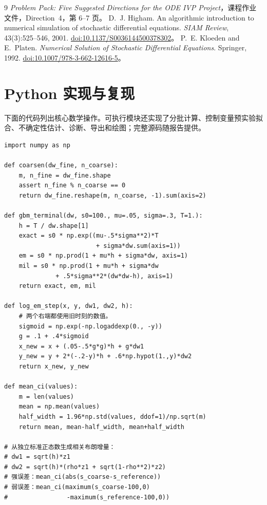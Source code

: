 \documentclass[11pt,a4paper,fontset=none]{ctexart}
\begin{document}
\begin{thebibliography}{9}
 \emph{Problem Pack: Five Suggested Directions for the ODE IVP Project}，课程作业文件，Direction~4，第 6--7 页。
 D.~J. Higham. An algorithmic introduction to numerical simulation of stochastic differential equations. \emph{SIAM Review}, 43(3):525--546, 2001.
\href{https://doi.org/10.1137/S0036144500378302}{doi:10.1137/S0036144500378302}。
 P.~E. Kloeden and E.~Platen. \emph{Numerical Solution of Stochastic Differential Equations}. Springer, 1992.
\href{https://doi.org/10.1007/978-3-662-12616-5}{doi:10.1007/978-3-662-12616-5}。
\end{thebibliography}

\newpage
\appendix
\section{Python 实现与复现}
下面的代码列出核心数学操作。可执行模块还实现了分批计算、控制变量预实验拟合、不确定性估计、诊断、导出和绘图；完整源码随报告提供。
\begin{lstlisting}[caption={核心 SDE 更新和共同路径误差统计。}]
import numpy as np

def coarsen(dw_fine, n_coarse):
    m, n_fine = dw_fine.shape
    assert n_fine % n_coarse == 0
    return dw_fine.reshape(m, n_coarse, -1).sum(axis=2)

def gbm_terminal(dw, s0=100., mu=.05, sigma=.3, T=1.):
    h = T / dw.shape[1]
    exact = s0 * np.exp((mu-.5*sigma**2)*T
                         + sigma*dw.sum(axis=1))
    em = s0 * np.prod(1 + mu*h + sigma*dw, axis=1)
    mil = s0 * np.prod(1 + mu*h + sigma*dw
              + .5*sigma**2*(dw*dw-h), axis=1)
    return exact, em, mil

def log_em_step(x, y, dw1, dw2, h):
    # 两个右端都使用旧时刻的数值。
    sigmoid = np.exp(-np.logaddexp(0., -y))
    g = .1 + .4*sigmoid
    x_new = x + (.05-.5*g*g)*h + g*dw1
    y_new = y + 2*(-.2-y)*h + .6*np.hypot(1.,y)*dw2
    return x_new, y_new

def mean_ci(values):
    m = len(values)
    mean = np.mean(values)
    half_width = 1.96*np.std(values, ddof=1)/np.sqrt(m)
    return mean, mean-half_width, mean+half_width

# 从独立标准正态数生成相关布朗增量：
# dw1 = sqrt(h)*z1
# dw2 = sqrt(h)*(rho*z1 + sqrt(1-rho**2)*z2)
# 强误差：mean_ci(abs(s_coarse-s_reference))
# 弱误差：mean_ci(maximum(s_coarse-100,0)
#                -maximum(s_reference-100,0))
\end{lstlisting}
\end{document}
